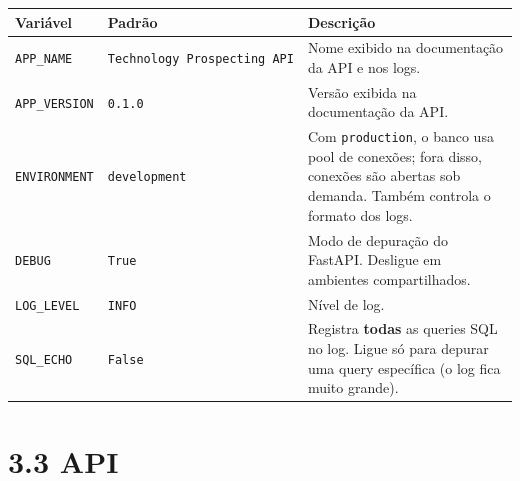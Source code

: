 \documentclass[
  brazilian,
  a4paper,12pt,oneside]{report}
\newcounter{none} %
\begin{document}
{\def\LTcaptype{none} %
\begin{longtable}[]{@{}
  >{\raggedright\arraybackslash}p{}
  >{\raggedright\arraybackslash}p{}
  >{\raggedright\arraybackslash}p{}@{}}
\toprule\noalign{}
\begin{minipage}[b]{\linewidth}\raggedright
Variável
\end{minipage} & \begin{minipage}[b]{\linewidth}\raggedright
Padrão
\end{minipage} & \begin{minipage}[b]{\linewidth}\raggedright
Descrição
\end{minipage} \\
\midrule\noalign{}
\endhead
\bottomrule\noalign{}
\endlastfoot
\texttt{APP\_}\allowbreak{}\texttt{NAME} &
\texttt{Technology\ Prospecting\ API} & Nome exibido na documentação da
API e nos logs. \\
\texttt{APP\_}\allowbreak{}\texttt{VERSION} &
\texttt{0.}\allowbreak{}\texttt{1.}\allowbreak{}\texttt{0} & Versão
exibida na documentação da API. \\
\texttt{ENVIRONMENT} & \texttt{development} & Com \texttt{production}, o
banco usa pool de conexões; fora disso, conexões são abertas sob
demanda. Também controla o formato dos logs. \\
\texttt{DEBUG} & \texttt{True} & Modo de depuração do FastAPI. Desligue
em ambientes compartilhados. \\
\texttt{LOG\_}\allowbreak{}\texttt{LEVEL} & \texttt{INFO} & Nível de
log. \\
\texttt{SQL\_}\allowbreak{}\texttt{ECHO} & \texttt{False} & Registra
\textbf{todas} as queries SQL no log. Ligue só para depurar uma query
específica (o log fica muito grande). \\
\end{longtable}
}

\section{3.3 API}\label{api}
\end{document}
